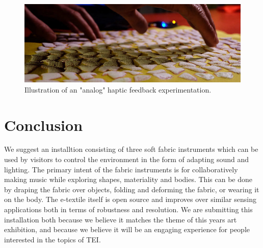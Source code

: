 \documentclass{sigchi-ext}
\begin{document}
\begin{figure}[h!]
    \centering
    \includegraphics[width=\columnwidth]{figures/zoom}
    \caption{Illustration of an "analog" haptic feedback experimentation.}\label{fig:zoom}
\end{figure}

\section{Conclusion}
We suggest an installtion consisting of three soft fabric instruments which can be used by visitors to control the environment in the form of adapting sound and lighting. The primary intent of the fabric instruments is for collaboratively making music while exploring shapes, materiality and bodies. This can be done by draping the fabric over objects, folding and deforming the fabric, or wearing it on the body. The e-textile itself is open source and improves over similar sensing applications both in terms of robustness and resolution. We are submitting this installation both because we believe it matches the theme of this years art exhibition, and because we believe it will be an engaging experience for people interested in the topics of TEI.





\end{document}
